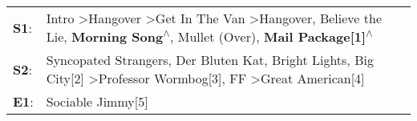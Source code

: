\begin{supertabular}{p{0.03\textwidth}p{0.92\textwidth}}
 \textbf{S1}:  &  Intro\textsuperscript{} \textgreater \enspace Hangover\textsuperscript{} \textgreater \enspace Get In The Van\textsuperscript{} \textgreater \enspace Hangover\textsuperscript{}, \enspace Believe the Lie\textsuperscript{}, \enspace \textbf{Morning Song\textsuperscript{$\wedge$}}, \enspace Mullet (Over)\textsuperscript{}, \enspace \textbf{Mail Package[1]\textsuperscript{$\wedge$}}  \enspace  \\
 \textbf{S2}:  &                                                                                                 Syncopated Strangers\textsuperscript{}, \enspace Der Bluten Kat\textsuperscript{}, \enspace Bright Lights, Big City[2]\textsuperscript{} \textgreater \enspace Professor Wormbog[3]\textsuperscript{}, \enspace FF\textsuperscript{} \textgreater \enspace Great American[4]\textsuperscript{}  \enspace  \\
 \textbf{E1}:  &                                                                                                                                                                                                                                                                                                                                                            Sociable Jimmy[5]\textsuperscript{}  \enspace  \\
\end{supertabular}
